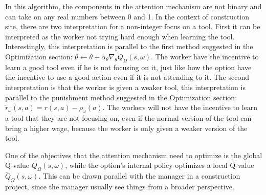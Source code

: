 \documentclass{article}
\begin{document}
	\quad In this algorithm, the components in the attention mechanism are not binary and can take on any real numbers between 0 and 1. In the context of construction site, there are two interpretation for a non-integer focus on a tool. First it can be interpreted as the worker not trying hard enough when learning the tool. Interestingly, this interpretation is parallel to the first method suggested in the Optimization section: $\theta \leftarrow \theta + \alpha_\theta \nabla_\theta Q_\Omega(s,\omega)$. The worker have the incentive to learn a good tool even if he is not focusing on it, just like how the option have the incentive to use a good action even if it is not attending to it. The second interpretation is that the worker is given a weaker tool, this interpretation is parallel to the punishment method suggested in the Optimization section: $\widetilde{r}_\omega(s,a)=r(s,a)-\rho_\omega(a)$. The workers will not have the incentive to learn a tool that they are not focusing on, even if the normal version of the tool can bring a higher wage, because the worker is only given a weaker version of the tool.
	
	\quad One of the objectives that the attention mechanism need to optimize is the global Q-value $Q_\Omega(s,\omega)$, while the option's internal policy optimizes a local Q-value $\widetilde{Q}_\Omega(s, \omega)$. This can be drawn parallel with the manager in a construction project, since the manager usually see things from a broader perspective.\vspace{0.1in}
	
\end{document}

